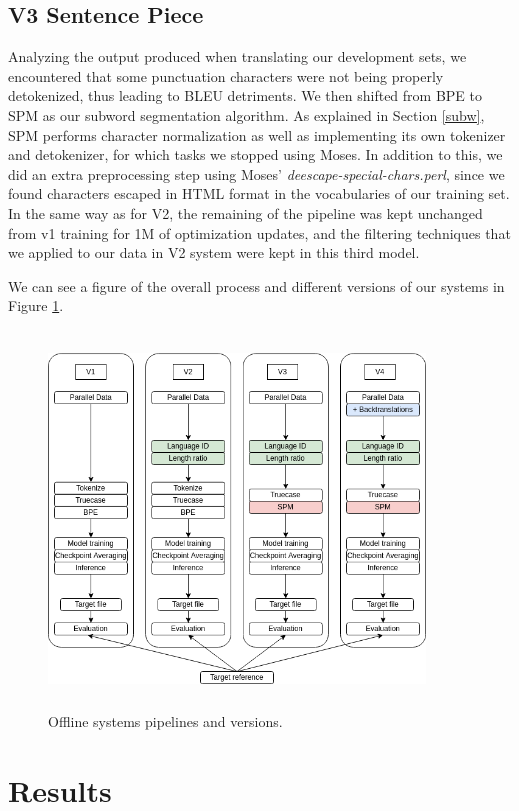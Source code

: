 \documentclass[11pt,english,listoffigures,listoftables]{tfgetsinf}
\begin{document}
\subsection{V3 Sentence Piece}\label{V3}
Analyzing the output produced when translating our development sets, we encountered that some punctuation characters were not being properly detokenized, thus leading to BLEU detriments. We then shifted from BPE to SPM as our subword segmentation algorithm. As explained in Section \ref{subw}, SPM performs character normalization as well as implementing its own tokenizer and detokenizer, for which tasks we stopped using Moses. In addition to this, we did an extra preprocessing step using Moses' \textit{deescape-special-chars.perl}, since we found characters escaped in HTML format in the vocabularies of our training set. In the same way as for V2, the remaining of the pipeline was kept unchanged from v1 training for 1M of optimization updates, and the filtering techniques that we applied to our data in V2 system were kept in this third model.

We can see a figure of the overall process and different versions of our systems in Figure \ref{chap4:pipeline}.

\begin{figure}
\centering
\includegraphics[width=10cm,keepaspectratio,height=10cm]{resources/pipeline.png}
\caption{Offline systems pipelines and versions.}\label{chap4:pipeline}
\end{figure}

\section{Results}
\end{document}
